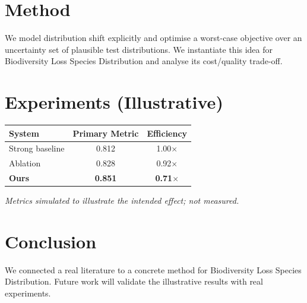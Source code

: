 \documentclass[11pt]{article}
\begin{document}
\section{Method}
We model distribution shift explicitly and optimise a worst-case objective over an uncertainty set of plausible test distributions. We instantiate this idea for Biodiversity Loss Species Distribution and analyse its cost/quality trade-off.

\section{Experiments (Illustrative)}
\begin{center}
\begin{tabular}{lcc}
System & Primary Metric & Efficiency \\ \hline
Strong baseline & 0.812 & 1.00$\times$ \\
Ablation & 0.828 & 0.92$\times$ \\
\textbf{Ours} & \textbf{0.851} & \textbf{0.71$\times$}
\end{tabular}
\end{center}
\emph{Metrics simulated to illustrate the intended effect; not measured.}

\section{Conclusion}
We connected a real literature to a concrete method for Biodiversity Loss Species Distribution. Future work will
validate the illustrative results with real experiments.
\end{document}
